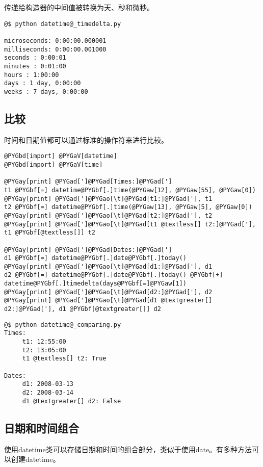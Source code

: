 \documentclass[letterpaper,10pt,english]{manual}
\begin{document}
传递给构造器的中间值被转换为天、秒和微秒。

\begin{Verbatim}[commandchars=@\[\]]
@$ python datetime@_timedelta.py

microseconds: 0:00:00.000001
milliseconds: 0:00:00.001000
seconds : 0:00:01
minutes : 0:01:00
hours : 1:00:00
days : 1 day, 0:00:00
weeks : 7 days, 0:00:00
\end{Verbatim}


\subsection{比较}

时间和日期值都可以通过标准的操作符来进行比较。

\begin{Verbatim}[commandchars=@\[\]]
@PYGbd[import] @PYGaV[datetime]
@PYGbd[import] @PYGaV[time]

@PYGay[print] @PYGad[']@PYGad[Times:]@PYGad[']
t1 @PYGbf[=] datetime@PYGbf[.]time(@PYGaw[12], @PYGaw[55], @PYGaw[0])
@PYGay[print] @PYGad[']@PYGao[\t]@PYGad[t1:]@PYGad['], t1
t2 @PYGbf[=] datetime@PYGbf[.]time(@PYGaw[13], @PYGaw[5], @PYGaw[0])
@PYGay[print] @PYGad[']@PYGao[\t]@PYGad[t2:]@PYGad['], t2
@PYGay[print] @PYGad[']@PYGao[\t]@PYGad[t1 @textless[] t2:]@PYGad['], t1 @PYGbf[@textless[]] t2

@PYGay[print] @PYGad[']@PYGad[Dates:]@PYGad[']
d1 @PYGbf[=] datetime@PYGbf[.]date@PYGbf[.]today()
@PYGay[print] @PYGad[']@PYGao[\t]@PYGad[d1:]@PYGad['], d1
d2 @PYGbf[=] datetime@PYGbf[.]date@PYGbf[.]today() @PYGbf[+] datetime@PYGbf[.]timedelta(days@PYGbf[=]@PYGaw[1])
@PYGay[print] @PYGad[']@PYGao[\t]@PYGad[d2:]@PYGad['], d2
@PYGay[print] @PYGad[']@PYGao[\t]@PYGad[d1 @textgreater[] d2:]@PYGad['], d1 @PYGbf[@textgreater[]] d2
\end{Verbatim}

\begin{Verbatim}[commandchars=@\[\]]
@$ python datetime@_comparing.py
Times:
     t1: 12:55:00
     t2: 13:05:00
     t1 @textless[] t2: True

Dates:
     d1: 2008-03-13
     d2: 2008-03-14
     d1 @textgreater[] d2: False
\end{Verbatim}


\subsection{日期和时间组合}

使用datetime类可以存储日期和时间的组合部分，类似于使用date。有多种方法可以创建datetime。
\end{document}
